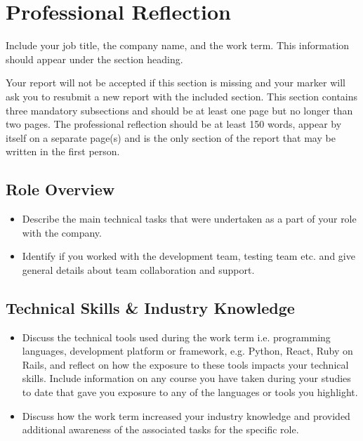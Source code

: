 \section*{Professional Reflection}

Include your job title, the company name, and the work term. This information should appear under the section heading.

Your report will not be accepted if this section is missing and your marker will ask you to resubmit a new report with the included section. This section contains three mandatory subsections and should be at least one page but no longer than two pages. The professional reflection should be at least 150 words, appear by itself on a separate page(s) and is the only section of the report that may be written in the first person.

\subsection*{Role Overview}

\begin{itemize}
  \item Describe the main technical tasks that were undertaken as a part of your role with the
        company.
  \item Identify if you worked with the development team, testing team etc. and give general details
        about team collaboration and support.
\end{itemize}

\subsection*{Technical Skills \& Industry Knowledge}

\begin{itemize}
  \item Discuss the technical tools used during the work term i.e. programming languages, development platform or framework, e.g. Python, React, Ruby on Rails, and reflect on how the exposure to these tools impacts your technical skills. Include information on any course you have taken during your studies to date that gave you exposure to any of the languages or tools you highlight.
  \item Discuss how the work term increased your industry knowledge and provided additional awareness of the associated tasks for the specific role.
\end{itemize}

